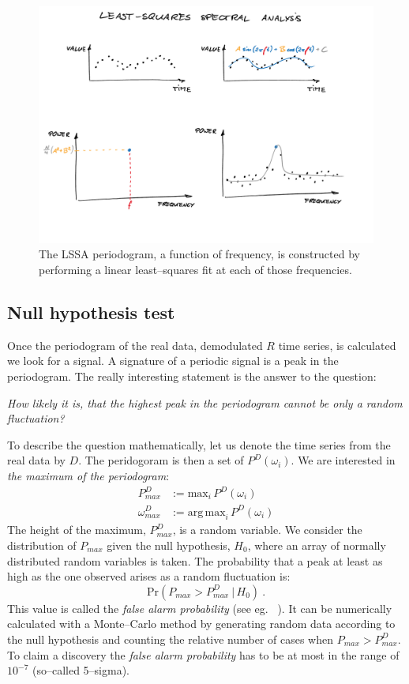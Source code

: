 \begin{figure}[htb]
  \centering \includegraphics[width=\linewidth]{gfx/axions/LSSA}
  \caption{The LSSA periodogram, a function of frequency, is constructed by performing a linear least--squares fit at each of those frequencies.}
  \label{fig:LSSA}
\end{figure}


\subsection{Null hypothesis test}
Once the periodogram of the real data, demodulated $R$ time series, is calculated we look for a signal. A signature of a periodic signal is a peak in the periodogram. The really interesting statement is the answer to the question:

\begin{center}
  \emph{How likely it is, that the highest peak in the periodogram cannot be only a random fluctuation?}
\end{center}

To describe the question mathematically, let us denote the time series from the real data by $D$. The peridogoram is then a set of $P^D(\omega_i)$. We are interested in \emph{the maximum of the periodogram}:
\begin{align}
  P_{max}^D &:= \mathrm{max}_i\,P^D(\omega_i) \\
  \omega_{max}^D &:= \mathrm{arg\,max}_i\,P^D(\omega_i)
\end{align}
The height of the maximum, $P_{max}^D$, is a random variable. We consider the distribution of $P_{max}$ given the null hypothesis, $H_0$, where an array of normally distributed random variables is taken. The probability that a peak at least as high as the one observed arises as a random fluctuation is:
\begin{equation}
  \mathrm{Pr}\left( P_{max} > P_{max}^D\ |\, H_0 \right) \ .
\end{equation}
This value is called the \emph{false alarm probability} (see eg. \citeauthor{Pandola2004}~\citep{Pandola2004}). It can be numerically calculated with a Monte--Carlo method by generating random data according to the null hypothesis and counting the relative number of cases when $P_{max} > P_{max}^D$. To claim a discovery the \emph{false alarm probability} has to be at most in the range of $10^{-7}$ (so--called 5--sigma).

